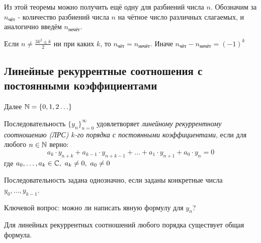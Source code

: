 Из этой теоремы можно получить ещё одну для разбиений числа $n$. Обозначим за $n_{\text{чёт}}$ - количество разбиений числа $n$ на чётное число различных слагаемых, и аналогично введём $n_{\text{нечёт}}$.

\begin{theorem}
	Если $n \neq \frac{3k^2 \pm k}{2}$ ни при каких $k$, то $n_{\text{чёт}} = n_{\text{нечёт}}$. Иначе $n_{\text{чёт}} - n_{\text{нечёт}} = (-1)^k$
\end{theorem}

\subsection{Линейные рекуррентные соотношения с постоянными коэффициентами}

\begin{note}
	Далее $\mathbb{N} = \{0, 1, 2 \ldots\}$
\end{note}

\begin{definition}
	Последовательность $\{y_n\}_{n = 0}^\infty$ удовлетворяет \textit{линейному рекуррентному соотношению (ЛРС) $k$-го порядка с постоянными коэффициентами}, если для любого $n \in \mathbb{N}$ верно:
	\[
		a_k \cdot y_{n + k} + a_{k - 1} \cdot y_{n + k - 1} + \ldots + a_1 \cdot y_{n + 1} + a_0 \cdot y_n = 0
	\]
	где $a_0, \ldots, a_k \in \Cm,\ a_k \neq 0,\ a_0 \neq 0$
\end{definition}

\begin{note}
	Последовательность задана однозначно, если заданы конкретные \linebreak числа $y_0, \ldots, y_{k - 1}$.
\end{note}

Ключевой вопрос: можно ли написать явную формулу для $y_n$?

\begin{proposition}
	Для линейных рекуррентных соотношений любого порядка существует общая формула.
\end{proposition}


